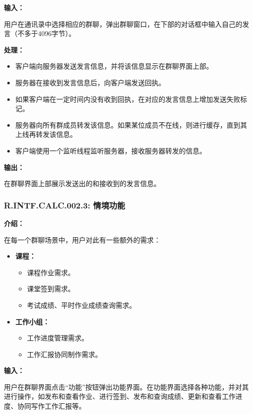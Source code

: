 \textbf{输入：}

用户在通讯录中选择相应的群聊，弹出群聊窗口，在下部的对话框中输入自己的发言（不多于4096字节）。

\textbf{处理：}

\begin{itemize}
  \item 客户端向服务器发送发言信息，并将该信息显示在群聊界面上部。
  \item 服务器在接收到发言信息后，向客户端发送回执。
  \item 如果客户端在一定时间内没有收到回执，在对应的发言信息上增加发送失败标记。
  \item 服务器向所有群成员转发该信息。如果某位成员不在线，则进行缓存，直到其上线再转发该信息。
  \item 客户端使用一个监听线程监听服务器，接收服务器转发的信息。
\end{itemize}

\textbf{输出：}

在群聊界面上部展示发送出的和接收到的发言信息。

\subsubsection{R.INTF.CALC.002.3: 情境功能}
\textbf{介绍：}

在每一个群聊场景中，用户对此有一些额外的需求：

\begin{itemize}
  \item \textbf{课程：}
        \begin{itemize}
        \item 课程作业需求。
        \item 课堂签到需求。
        \item 考试成绩、平时作业成绩查询需求。
        \end{itemize}
  \item \textbf{工作小组：}
        \begin{itemize}
        \item 工作进度管理需求。
        \item 工作汇报协同制作需求。
        \end{itemize}
\end{itemize}

\textbf{输入：}

用户在群聊界面点击“功能”按钮弹出功能界面。在功能界面选择各种功能，并对其进行操作，如发布和查看作业、进行签到、发布和查询成绩、更新和查看工作进度、协同写作工作汇报等。

